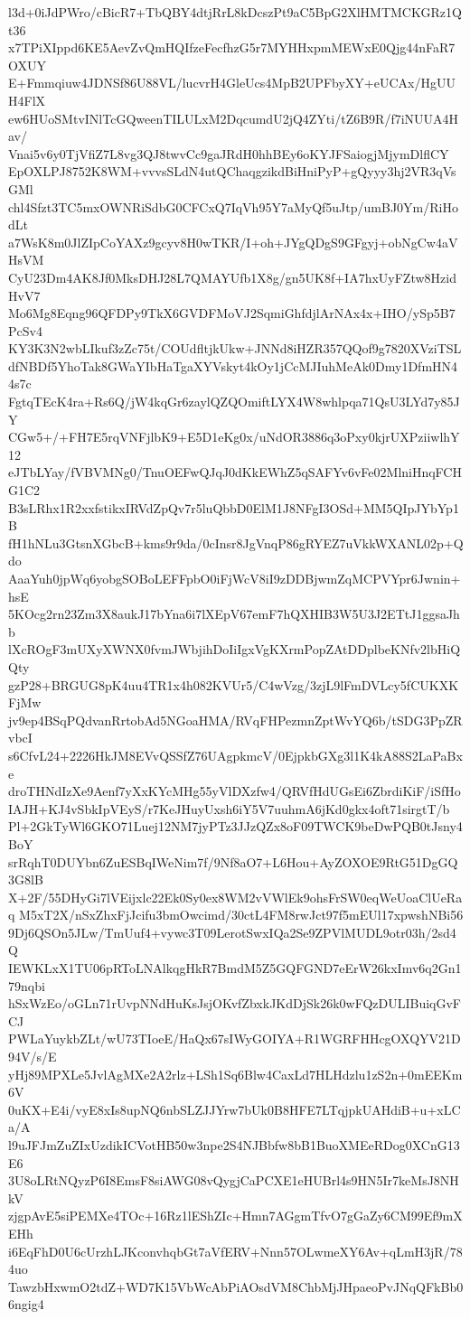 l3d+0iJdPWro/cBicR7+TbQBY4dtjRrL8kDcszPt9aC5BpG2XlHMTMCKGRz1Qt36
x7TPiXIppd6KE5AevZvQmHQIfzeFecfhzG5r7MYHHxpmMEWxE0Qjg44nFaR7OXUY
E+Fmmqiuw4JDNSf86U88VL/lucvrH4GleUcs4MpB2UPFbyXY+eUCAx/HgUUH4FlX
ew6HUoSMtvINlTcGQweenTILULxM2DqcumdU2jQ4ZYti/tZ6B9R/f7iNUUA4Hav/
Vnai5v6y0TjVfiZ7L8vg3QJ8twvCc9gaJRdH0hhBEy6oKYJFSaiogjMjymDlflCY
EpOXLPJ8752K8WM+vvvsSLdN4utQChaqgzikdBiHniPyP+gQyyy3hj2VR3qVsGMl
chl4Sfzt3TC5mxOWNRiSdbG0CFCxQ7IqVh95Y7aMyQf5uJtp/umBJ0Ym/RiHodLt
a7WsK8m0JlZIpCoYAXz9gcyv8H0wTKR/I+oh+JYgQDgS9GFgyj+obNgCw4aVHsVM
CyU23Dm4AK8Jf0MksDHJ28L7QMAYUfb1X8g/gn5UK8f+IA7hxUyFZtw8HzidHvV7
Mo6Mg8Eqng96QFDPy9TkX6GVDFMoVJ2SqmiGhfdjlArNAx4x+IHO/ySp5B7PcSv4
KY3K3N2wbLIkuf3zZc75t/COUdfltjkUkw+JNNd8iHZR357QQof9g7820XVziTSL
dfNBDf5YhoTak8GWaYIbHaTgaXYVskyt4kOy1jCcMJIuhMeAk0Dmy1DfmHN44s7c
FgtqTEcK4ra+Rs6Q/jW4kqGr6zaylQZQOmiftLYX4W8whlpqa71QsU3LYd7y85JY
CGw5+/+FH7E5rqVNFjlbK9+E5D1eKg0x/uNdOR3886q3oPxy0kjrUXPziiwlhY12
eJTbLYay/fVBVMNg0/TnuOEFwQJqJ0dKkEWhZ5qSAFYv6vFe02MlniHnqFCHG1C2
B3sLRhx1R2xxfstikxIRVdZpQv7r5luQbbD0ElM1J8NFgI3OSd+MM5QIpJYbYp1B
fH1hNLu3GtsnXGbcB+kms9r9da/0cInsr8JgVnqP86gRYEZ7uVkkWXANL02p+Qdo
AaaYuh0jpWq6yobgSOBoLEFFpbO0iFjWcV8iI9zDDBjwmZqMCPVYpr6Jwnin+hsE
5KOcg2rn23Zm3X8aukJ17bYna6i7lXEpV67emF7hQXHIB3W5U3J2ETtJ1ggsaJhb
lXcROgF3mUXyXWNX0fvmJWbjihDoIiIgxVgKXrmPopZAtDDplbeKNfv2lbHiQQty
gzP28+BRGUG8pK4uu4TR1x4h082KVUr5/C4wVzg/3zjL9lFmDVLcy5fCUKXKFjMw
jv9ep4BSqPQdvanRrtobAd5NGoaHMA/RVqFHPezmnZptWvYQ6b/tSDG3PpZRvbcI
s6CfvL24+2226HkJM8EVvQSSfZ76UAgpkmcV/0EjpkbGXg3l1K4kA88S2LaPaBxe
droTHNdIzXe9Aenf7yXxKYcMHg55yVlDXzfw4/QRVfHdUGsEi6ZbrdiKiF/iSfHo
IAJH+KJ4vSbkIpVEyS/r7KeJHuyUxsh6iY5V7uuhmA6jKd0gkx4oft71sirgtT/b
Pl+2GkTyWl6GKO71Luej12NM7jyPTz3JJzQZx8oF09TWCK9beDwPQB0tJsny4BoY
srRqhT0DUYbn6ZuESBqIWeNim7f/9Nf8aO7+L6Hou+AyZOXOE9RtG51DgGQ3G8lB
X+2F/55DHyGi7lVEijxlc22Ek0Sy0ex8WM2vVWlEk9ohsFrSW0eqWeUoaClUeRaq
M5xT2X/nSxZhxFjJcifu3bmOwcimd/30ctL4FM8rwJct97f5mEUl17xpwshNBi56
9Dj6QSOn5JLw/TmUuf4+vywc3T09LerotSwxIQa2Se9ZPVlMUDL9otr03h/2sd4Q
IEWKLxX1TU06pRToLNAlkqgHkR7BmdM5Z5GQFGND7eErW26kxImv6q2Gn179nqbi
hSxWzEo/oGLn71rUvpNNdHuKsJsjOKvfZbxkJKdDjSk26k0wFQzDULIBuiqGvFCJ
PWLaYuykbZLt/wU73TIoeE/HaQx67sIWyGOIYA+R1WGRFHHcgOXQYV21D94V/s/E
yHj89MPXLe5JvlAgMXe2A2rlz+LSh1Sq6Blw4CaxLd7HLHdzlu1zS2n+0mEEKm6V
0uKX+E4i/vyE8xIs8upNQ6nbSLZJJYrw7bUk0B8HFE7LTqjpkUAHdiB+u+xLCa/A
l9uJFJmZuZIxUzdikICVotHB50w3npe2S4NJBbfw8bB1BuoXMEeRDog0XCnG13E6
3U8oLRtNQyzP6I8EmsF8siAWG08vQygjCaPCXE1eHUBrl4s9HN5Ir7keMsJ8NHkV
zjgpAvE5siPEMXe4TOc+16Rz1lEShZIc+Hmn7AGgmTfvO7gGaZy6CM99Ef9mXEHh
i6EqFhD0U6cUrzhLJKconvhqbGt7aVfERV+Nnn57OLwmeXY6Av+qLmH3jR/784uo
TawzbHxwmO2tdZ+WD7K15VbWcAbPiAOsdVM8ChbMjJHpaeoPvJNqQFkBb06ngig4
